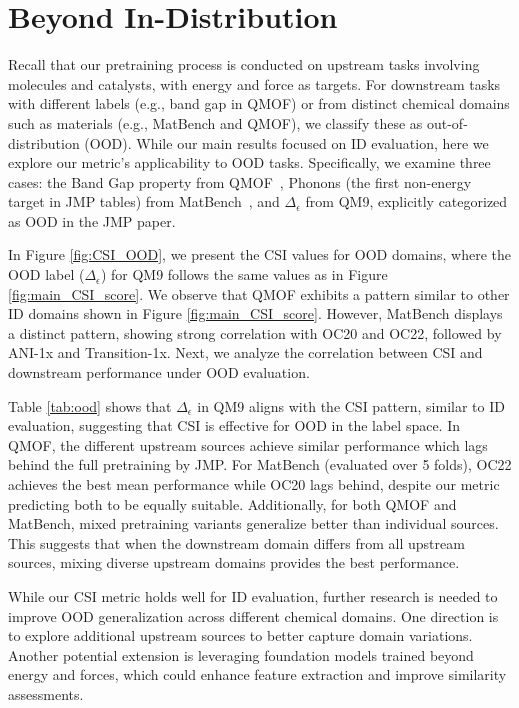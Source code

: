 \section{Beyond In-Distribution}
\label{5_OOD}

Recall that our pretraining process is conducted on upstream tasks involving molecules and catalysts, with energy and force as targets. For downstream tasks with different labels (e.g., band gap in QMOF) or from distinct chemical domains such as materials (e.g., MatBench and QMOF), we classify these as out-of-distribution (OOD). While our main results focused on ID evaluation, here we explore our metric's applicability to OOD tasks. Specifically, we examine three cases: the Band Gap property from QMOF~\cite{rosen2021machine}, Phonons (the first non-energy target in JMP tables) from MatBench~\cite{dunn2020benchmarking}, and $\Delta_\epsilon$ from QM9, explicitly categorized as OOD in the JMP paper.

In Figure \ref{fig:CSI_OOD}, we present the CSI values for OOD domains, where the OOD label ($\Delta_\epsilon$) for QM9 follows the same values as in Figure \ref{fig:main_CSI_score}. We observe that QMOF exhibits a pattern similar to other ID domains shown in Figure \ref{fig:main_CSI_score}. However, MatBench displays a distinct pattern, showing strong correlation with OC20 and OC22, followed by ANI-1x and Transition-1x. Next, we analyze the correlation between CSI and downstream performance under OOD evaluation.

Table \ref{tab:ood} shows that $\Delta_\epsilon$ in QM9 aligns with the CSI pattern, similar to ID evaluation, suggesting that CSI is effective for OOD in the label space. In QMOF, the different upstream sources achieve similar performance which lags behind the full pretraining by JMP. For MatBench (evaluated over 5 folds), OC22 achieves the best mean performance while OC20 lags behind, despite our metric predicting both to be equally suitable. Additionally, for both QMOF and MatBench, mixed pretraining variants generalize better than individual sources. This suggests that when the downstream domain differs from all upstream sources, mixing diverse upstream domains provides the best performance.

While our CSI metric holds well for ID evaluation, further research is needed to improve OOD generalization across different chemical domains. One direction is to explore additional upstream sources to better capture domain variations. Another potential extension is leveraging foundation models trained beyond energy and forces, which could enhance feature extraction and improve similarity assessments.


